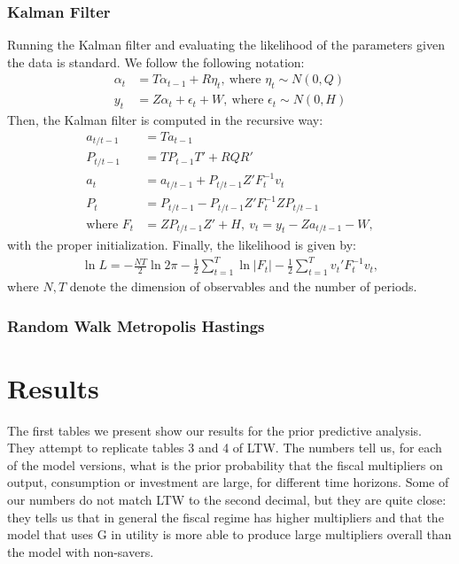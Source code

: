 \documentclass[letterpaper,12pt]{article}%
\begin{document}
\subsubsection*{Kalman Filter}
Running the Kalman filter and evaluating the likelihood of the parameters given the data is standard. We follow the following notation:
\begin{align*}
\alpha_t &= T \alpha_{t-1} + R \eta_t, \ \text{where } \eta_t \sim N(0,Q) \\
y_t &= Z \alpha_t + \epsilon_t + W, \ \text{where } \epsilon_t \sim N(0,H)
\end{align*}
Then, the Kalman filter is computed in the recursive way:
\begin{align*}
a_{t/t-1} &= T a_{t-1} \\
P_{t/t-1} &= T P_{t-1} T' + R Q R' \\
a_t &= a_{t/t-1} + P_{t/t-1} Z' F_t^{-1} v_t\\
P_t &= P_{t/t-1} - P_{t/t-1} Z' F_t^{-1} Z P_{t/t-1} \\
\text{where } F_t&= Z P_{t/t-1} Z' + H, \ v_t = y_t - Z a_{t/t-1} - W,
\end{align*}
with the proper initialization. Finally, the likelihood is given by:
\begin{align*}
\ln L = -\frac{NT}{2} \ln 2\pi - \frac{1}{2} \sum_{t=1}^{T} \ln |F_t| - \frac{1}{2} \sum_{t=1}^T v_t' F_t^{-1} v_t,
\end{align*}
where $N,T$ denote the dimension of observables and the number of periods.

\subsubsection{Random Walk Metropolis Hastings}

\section{Results}
The first tables we present show our results for the prior predictive analysis. They attempt to replicate tables 3 and 4 of LTW. The numbers tell us, for each of the model versions, what is the prior probability that the fiscal multipliers on output, consumption or investment are large, for different time horizons. Some of our numbers do not match LTW to the second decimal, but they are quite close: they tells us that in general the fiscal regime has higher multipliers and that the model that uses G in utility is more able to produce large multipliers overall than the model with non-savers.
\end{document}
